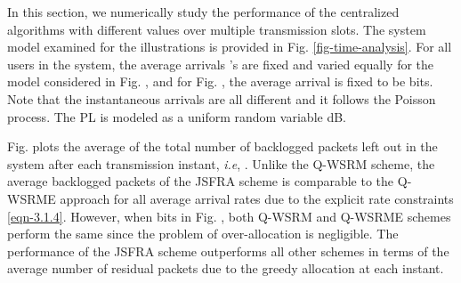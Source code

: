 In this section, we numerically study the performance of the centralized algorithms with different  values over multiple transmission slots. The system model examined for the illustrations is provided in Fig. \ref{fig-time-analysis}. For all users in the system, the average arrivals 's are fixed and varied equally for the model considered in Fig. , and for Fig. , the average arrival is fixed to be  bits. Note that the instantaneous arrivals  are all different and it follows the Poisson process. The \ac{PL} is modeled as a uniform random variable \me{[0,-6]} dB.
\begin{figure*}
	\centering
	\hfill
	\caption{Time analysis of the Queue dynamics for a system }
	\label{fig-time-analysis}
\end{figure*}

Fig.  plots the average of the total number of backlogged packets left out in the system after each transmission instant, \textit{i.e}, . Unlike the \ac{Q-WSRM} scheme, the average backlogged packets of the  \ac{JSFRA} scheme is comparable to the \ac{Q-WSRME} approach for all average arrival rates due to the explicit rate constraints \eqref{eqn-3.1.4}. However, when  bits in Fig. , both \ac{Q-WSRM} and \ac{Q-WSRME} schemes perform the same since the problem of over-allocation is negligible. The performance of the  \ac{JSFRA} scheme outperforms all other schemes in terms of the average number of residual packets due to the greedy allocation at each instant. 

